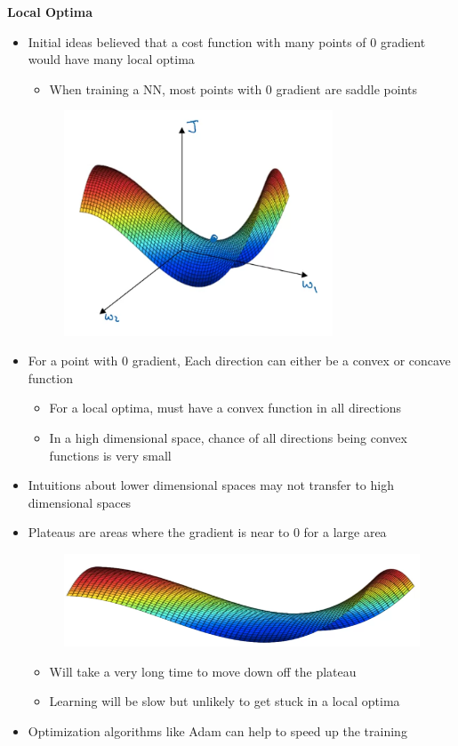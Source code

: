 \documentclass[12pt, letterpaper]{article}
\begin{document}
    \vspace{5mm}
    \textbf{Local Optima}
    \begin{itemize}
        \item Initial ideas believed that a cost function with many points of 0 gradient would have many local optima
        \begin{itemize}
            \item When training a NN, most points with 0 gradient are saddle points
        \end{itemize}
        \begin{figure}[ht]
            \centering
            \includegraphics[width=8cm]{21.png}
        \end{figure}
        \item For a point with 0 gradient, Each direction can either be a convex or concave function
        \begin{itemize}
            \item For a local optima, must have a convex function in all directions
            \item In a high dimensional space, chance of all directions being convex functions is very small
        \end{itemize}
        \item Intuitions about lower dimensional spaces may not transfer to high dimensional spaces
        \item Plateaus are areas where the gradient is near to 0 for a large area
        \begin{figure}[ht]
            \centering 
            \includegraphics[width=12cm]{22.png}
        \end{figure}
        \begin{itemize}
            \item Will take a very long time to move down off the plateau
            \item Learning will be slow but unlikely to get stuck in a local optima
        \end{itemize}
        \item Optimization algorithms like Adam can help to speed up the training
    \end{itemize}
    
\end{document}
